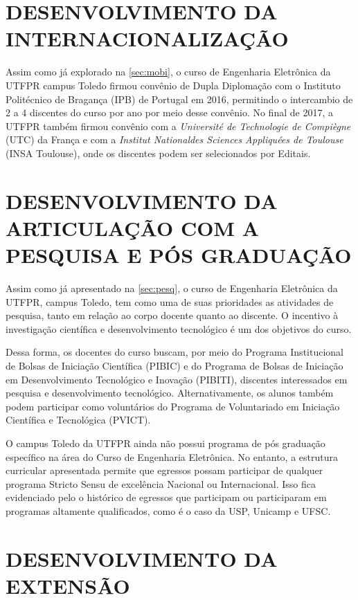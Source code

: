 \section{DESENVOLVIMENTO DA INTERNACIONALIZAÇÃO}

Assim como já explorado na \autoref{sec:mobi}, o curso de Engenharia Eletrônica da UTFPR campus Toledo firmou convênio de Dupla Diplomação com o Instituto Politécnico de Bragança (IPB) de Portugal em 2016, permitindo o intercambio de 2 a 4 discentes do curso por ano por meio desse convênio. No final de 2017, a UTFPR também firmou convênio com a \textit{Université de Technologie de Compiègne} (UTC) da França e com a \textit{Institut Nationaldes Sciences Appliquées de Toulouse} (INSA Toulouse), onde os discentes podem ser selecionados por Editais.

\section{DESENVOLVIMENTO DA ARTICULAÇÃO COM A PESQUISA E PÓS GRADUAÇÃO}

Assim como já apresentado na \autoref{sec:pesq}, o curso de Engenharia Eletrônica da UTFPR, campus Toledo, tem como uma de suas prioridades as atividades de pesquisa, tanto em relação ao corpo docente quanto ao discente. O incentivo à investigação científica e desenvolvimento tecnológico é um dos objetivos do curso.

Dessa forma, os docentes do curso buscam, por meio do Programa Institucional de Bolsas de Iniciação Científica (PIBIC) e do Programa de Bolsas de Iniciação em Desenvolvimento Tecnológico e Inovação (PIBITI), discentes interessados em pesquisa e desenvolvimento tecnológico. Alternativamente, os alunos também podem participar como voluntários do Programa de Voluntariado em Iniciação Científica e Tecnológica (PVICT).

O campus Toledo da UTFPR ainda não possui programa de pós graduação específico na área do Curso de Engenharia Eletrônica. No entanto, a estrutura curricular apresentada permite que egressos possam participar de qualquer programa Stricto Sensu de excelência Nacional ou Internacional. Isso fica evidenciado pelo o histórico de egressos que participam ou participaram em programas altamente qualificados, como é o caso da USP, Unicamp e UFSC.

\section{DESENVOLVIMENTO DA EXTENSÃO}

